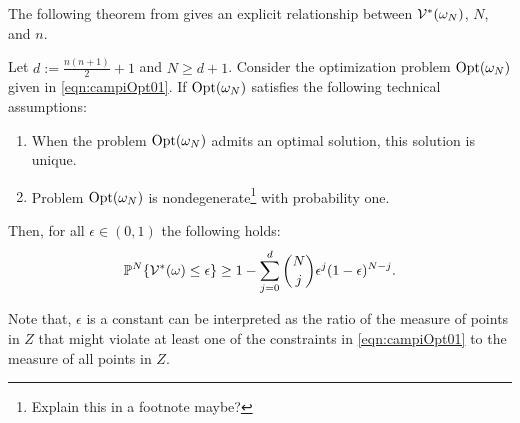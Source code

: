 The following theorem from \cite{campi} gives an explicit relationship between $\mathcal{V}^*(\omega_N)$, $N$, and $n$.
\begin{theorem}\label{thm:campi}Let $d:=\frac{n(n+1)}{2}+1$ and $N \geq d+1$. Consider the optimization problem $\text{Opt}(\omega_N)$ given in \eqref{eqn:campiOpt01}. If $\text{Opt}(\omega_N)$ satisfies the following technical assumptions:
\begin{enumerate}
\item When the problem $\text{Opt}(\omega_N)$ admits an optimal solution, this solution is unique.
\item Problem $\text{Opt}(\omega_N)$ is nondegenerate\footnote{Explain this in a footnote maybe?} with probability one.
\end{enumerate}
Then, for all $\epsilon \in (0,1)$ the following holds:
\begin{equation*}\mathbb{P}^N\{\mathcal{V}^*(\omega) \leq \epsilon \} \geq 1- \sum_{j=0}^{d} \binom{N}{j}\epsilon^j (1-\epsilon)^{N-j}.\end{equation*}
\end{theorem}
Note that, $\epsilon$ is a constant can be interpreted as the ratio of the measure of points in $Z$ that might violate at least one of the constraints in \eqref{eqn:campiOpt01} to the measure of all points in $Z$.

